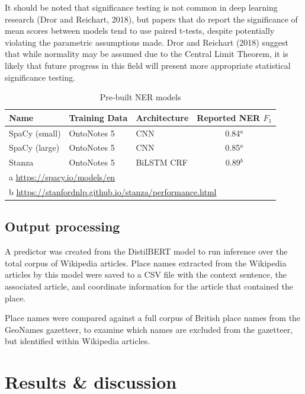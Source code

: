 \documentclass[
  letterpaper,
  11pt,
  english,
  onehalfspacing,
  headsepline]{MastersDoctoralThesis}
\begin{document}
It should be noted that significance testing is not common in deep
learning research (Dror and Reichart, 2018), but papers that do report
the significance of mean scores between models tend to use paired
t-tests, despite potentially violating the parametric assumptions made.
Dror and Reichart (2018) suggest that while normality may be assumed due
to the Central Limit Theorem, it is likely that future progress in this
field will present more appropriate statistical significance testing.

\begin{table}

\caption{\label{tbl-prebuilt}Pre-built NER models}
\centering
\fontsize{9}{11}\selectfont
\begin{tabular}[t]{lllc}
\toprule
\textbf{Name} & \textbf{Training Data} & \textbf{Architecture} & \textbf{Reported NER $F_{1}$}\\
\midrule
SpaCy (small) & OntoNotes 5 & CNN & 0.84$^a$\\
SpaCy (large) & OntoNotes 5 & CNN & 0.85$^a$\\
Stanza & OntoNotes 5 & BiLSTM CRF & 0.89$^b$\\
\bottomrule
\multicolumn{4}{l}{\rule{0pt}{1em}a \href{https://spacy.io/models/en}{https://spacy.io/models/en}}\\
\multicolumn{4}{l}{\rule{0pt}{1em}b \href{https://stanfordnlp.github.io/stanza/performance.html}{https://stanfordnlp.github.io/stanza/performance.html}}\\
\end{tabular}
\end{table}

\hypertarget{output-processing}{%
\subsection{Output processing}\label{output-processing}}

A predictor was created from the DistilBERT model to run inference over
the total corpus of Wikipedia articles. Place names extracted from the
Wikipedia articles by this model were saved to a CSV file with the
context sentence, the associated article, and coordinate information for
the article that contained the place.

Place names were compared against a full corpus of British place names
from the GeoNames gazetteer, to examine which names are excluded from
the gazetteer, but identified within Wikipedia articles.

\hypertarget{sec-trans-results-discussion}{%
\section{Results \& discussion}\label{sec-trans-results-discussion}}
\end{document}
